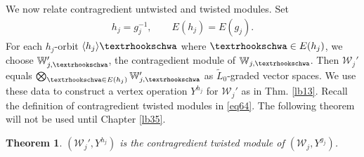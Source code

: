 \documentclass[12pt,a4paper,notitlepage]{article}
\theoremstyle{definition}
\theoremstyle{plain}
\newtheorem{thm}[df]{Theorem}
\newcommand{\mc}{\mathcal}
\newcommand{\wtd}{\widetilde}
\newcommand{\bk}[1]{\langle {#1}\rangle}
\newcommand{\Wbb}{\mathbb W}
\newcommand{\tipae}{\text{\textrhookschwa}}
\numberwithin{equation}{subsection}
\begin{document}
We now relate contragredient untwisted and twisted modules. Set
\begin{align}
h_j=g_j^{-1},\qquad E(h_j)=E(g_j).	
\end{align}
For each $h_j$-orbit $\bk{h_j}\tipae$ where $\tipae\in E(h_j)$, we choose $\Wbb_{j,\tipae}'$, the contragedient module of $\Wbb_{j,\tipae}$. Then $\mc W_j'$ equals $\bigotimes_{\tipae\in E(h_j)}\Wbb_{j,\tipae}'$ as $\wtd L_0$-graded vector spaces. We use these data to construct a vertex operation $Y^{h_j}$ for $\mc W_j'$ as in Thm. \ref{lb13}. Recall the definition of contragredient twisted modules in \eqref{eq64}. The following theorem will not be used until Chapter \ref{lb35}.

\begin{thm}\label{lb42}
$(\mc W_j',Y^{h_j})$ is the contragredient twisted module of $(\mc W_j,Y^{g_j})$.
\end{thm}
\end{document}
